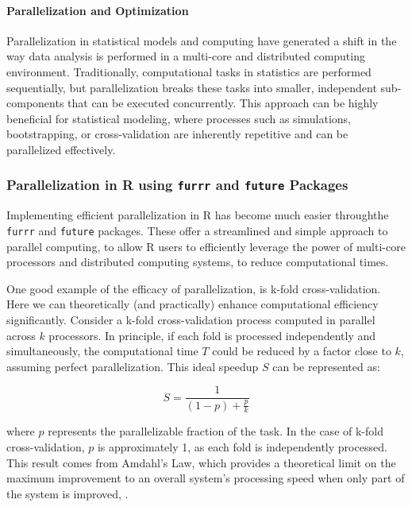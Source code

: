 \documentclass[12pt, twoside,hidelinks]{article}
\theoremstyle{definition}
\numberwithin{equation}{section}
\begin{document}
\paragraph{Parallelization and Optimization}\label{sec:domains:bigdata:optim}

Parallelization in statistical models and computing have generated a shift in the way data analysis is performed in a multi-core and distributed computing environment. Traditionally, computational tasks in statistics are performed sequentially, but parallelization breaks these tasks into smaller, independent sub-components that can be executed concurrently. This approach can be highly beneficial for statistical modeling, where processes such as simulations, bootstrapping, or cross-validation are inherently repetitive and can be parallelized effectively.
\newline

\subsubsection*{Parallelization in R using \texttt{furrr} and \texttt{future} Packages}

Implementing efficient parallelization in R has become much easier throughthe \texttt{furrr} and \texttt{future} packages. These offer a streamlined and simple approach to parallel computing, to allow R users to efficiently leverage the power of multi-core processors and distributed computing systems, to reduce computational times.
\newline

One good example of the efficacy of parallelization, is k-fold cross-validation. Here we can theoretically (and practically) enhance computational efficiency significantly. Consider a k-fold cross-validation process computed in parallel across \( k \) processors. In principle, if each fold is processed independently and simultaneously, the computational time \( T \) could be reduced by a factor close to \( k \), assuming perfect parallelization. This ideal speedup \( S \) can be represented as:

\[ S = \frac{1}{\left(1 - p\right) + \frac{p}{k}} \]

where \( p \) represents the parallelizable fraction of the task. In the case of k-fold cross-validation, \( p \) is approximately 1, as each fold is independently processed. This result comes from Amdahl's Law, which provides a theoretical limit on the maximum improvement to an overall system's processing speed when only part of the system is improved, \citet{Amdahl1967}.
\end{document}
